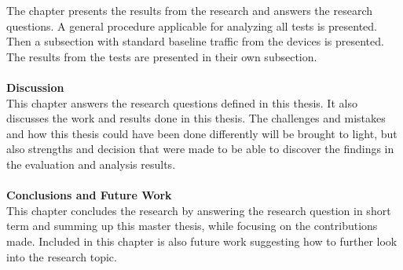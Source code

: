 The chapter presents the results from the research and answers the research questions. A general procedure applicable for analyzing all tests is presented. Then a subsection with standard baseline traffic from the devices is presented. The results from the tests are presented in their own subsection.  
\\\\
\textbf{Discussion}
\\
This chapter answers the research questions defined in this thesis. It also discusses the work and results done in this thesis. The challenges and mistakes and how this thesis could have been done differently will be brought to light, but also strengths and decision that were made to be able to discover the findings in the evaluation and analysis results. 
\\\\
\textbf{Conclusions and Future Work}
\\
This chapter concludes the research by answering the research question in short term and summing up this master thesis, while focusing on the contributions made. Included in this chapter is also future work suggesting how to further look into the research topic.